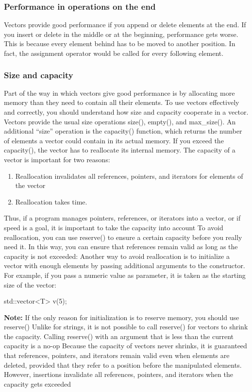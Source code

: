 \documentclass{report}
\begin{document}
   \bigbreak \noindent 
   \subsubsection{Performance in operations on the end}
   \bigbreak \noindent 
   Vectors provide good performance if you append or delete elements at the end. If you insert or
   delete in the middle or at the beginning, performance gets worse. This is because every element
   behind has to be moved to another position. In fact, the assignment operator would be called for
   every following element.

   \bigbreak \noindent 
   \subsubsection{Size and capacity}
   \bigbreak \noindent 
   Part of the way in which vectors give good performance is by allocating more memory than they
   need to contain all their elements. To use vectors effectively and correctly, you should understand
   how size and capacity cooperate in a vector.
   \bigbreak \noindent 
   Vectors provide the usual size operations size(), empty(), and max\_size(). An additional “size” operation is the capacity() function, which returns the number of
   elements a vector could contain in its actual memory. If you exceed the capacity(), the vector has
   to reallocate its internal memory.
   \bigbreak \noindent 
   The capacity of a vector is important for two reasons:
   \begin{enumerate}
       \item Reallocation invalidates all references, pointers, and iterators for elements of the vector
       \item Reallocation takes time.
   \end{enumerate}
   Thus, if a program manages pointers, references, or iterators into a vector, or if speed is a goal, it is
   important to take the capacity into account
   \bigbreak \noindent 
   To avoid reallocation, you can use reserve() to ensure a certain capacity before you really need
it. In this way, you can ensure that references remain valid as long as the capacity is not exceeded:
\bigbreak \noindent 
Another way to avoid reallocation is to initialize a vector with enough elements by passing additional
arguments to the constructor. For example, if you pass a numeric value as parameter, it is taken as
the starting size of the vector:
\bigbreak \noindent 
\begin{cppcode}
    std::vector<T> v(5);
\end{cppcode}
\bigbreak \noindent 
\textbf{Note:} If the only reason for initialization is to reserve memory, you should use reserve()
\bigbreak \noindent 
Unlike for strings, it is not possible to call reserve() for vectors to shrink the capacity. Calling reserve() with an argument that is less than the current capacity is a no-op
\bigbreak \noindent 
Because the capacity of vectors never shrinks, it is guaranteed that references, pointers, and
iterators remain valid even when elements are deleted, provided that they refer to a position before
the manipulated elements. However, insertions invalidate all references, pointers, and iterators when
the capacity gets exceeded
\end{document}
